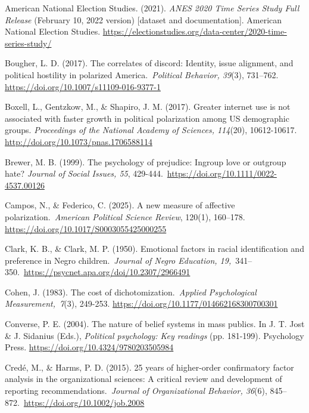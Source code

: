 \documentclass[authordate, meta]{jote-new-article}
\begin{document}
	American National Election Studies. (2021). \emph{ANES 2020 Time Series Study Full Release} (February 10, 2022 version) [dataset and documentation]. American National Election Studies. \url{https://electionstudies.org/data-center/2020-time-series-study/}



	Bougher, L. D. (2017). The correlates of discord: Identity, issue alignment, and political hostility in polarized America. \emph{Political Behavior, 39}(3), 731--762. \url{https://doi.org/10.1007/s11109-016-9377-1}



	Boxell, L., Gentzkow, M., \& Shapiro, J. M. (2017). Greater internet use is not associated with faster growth in political polarization among US demographic groups. \emph{Proceedings of the National Academy of Sciences, 114}(20), 10612-10617. \url{http://doi.org/10.1073/pnas.1706588114}



	Brewer, M. B. (1999). The psychology of prejudice: Ingroup love or outgroup hate? \emph{Journal of Social Issues, 55}, 429-444. \url{https://doi.org/10.1111/0022-4537.00126}



	Campos, N., \& Federico, C. (2025). A new measure of affective polarization. \emph{American Political Science Review}, 120(1), 160--178. \url{https://doi.org/10.1017/S0003055425000255}



	Clark, K. B., \& Clark, M. P. (1950). Emotional factors in racial identification and preference in Negro children. \emph{Journal of Negro Education, 19,} 341--350. \url{https://psycnet.apa.org/doi/10.2307/2966491}



	Cohen, J. (1983). The cost of dichotomization.\emph{ Applied Psychological Measurement, 7}(3), 249-253. \url{https://doi.org/10.1177/014662168300700301}



	Converse, P. E. (2004). The nature of belief systems in mass publics. In J. T. Jost \& J. Sidanius (Eds.), \emph{Political psychology: Key readings} (pp. 181-199). Psychology Press. \url{https://doi.org/10.4324/9780203505984}



	Credé, M., \& Harms, P. D. (2015). 25 years of higher-order confirmatory factor analysis in the organizational sciences: A critical review and development of reporting recommendations. \emph{Journal of Organizational Behavior, 36}(6), 845--872. \url{https://doi.org/10.1002/job.2008}
\end{document}
